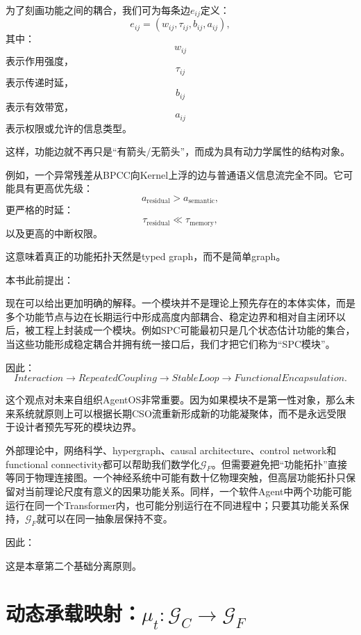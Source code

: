 为了刻画功能之间的耦合，我们可为每条边$e_{ij}$定义：
\[
e_{ij}
=
(
w_{ij},
\tau_{ij},
b_{ij},
a_{ij}
),
\]
其中：
\[
w_{ij}
\]
表示作用强度，
\[
\tau_{ij}
\]
表示传递时延，
\[
b_{ij}
\]
表示有效带宽，
\[
a_{ij}
\]
表示权限或允许的信息类型。

这样，功能边就不再只是“有箭头/无箭头”，而成为具有动力学属性的结构对象。

例如，一个异常残差从BPCC向Kernel上浮的边与普通语义信息流完全不同。它可能具有更高优先级：
\[
a_{\text{residual}}>a_{\text{semantic}},
\]
更严格的时延：
\[
\tau_{\text{residual}}\ll\tau_{\text{memory}},
\]
以及更高的中断权限。

这意味着真正的功能拓扑天然是typed graph，而不是简单graph。

本书此前提出：
\begin{statementbox}
\centering
{}
\end{statementbox}
现在可以给出更加明确的解释。一个模块并不是理论上预先存在的本体实体，而是多个功能节点与边在长期运行中形成高度内部耦合、稳定边界和相对自主闭环以后，被工程上封装成一个模块。例如SPC可能最初只是几个状态估计功能的集合，当这些功能形成稳定耦合并拥有统一接口后，我们才把它们称为“SPC模块”。

因此：
\[
Interaction
\rightarrow
RepeatedCoupling
\rightarrow
StableLoop
\rightarrow
FunctionalEncapsulation.
\]

这个观点对未来自组织AgentOS非常重要。因为如果模块不是第一性对象，那么未来系统就原则上可以根据长期CSO流重新形成新的功能凝聚体，而不是永远受限于设计者预先写死的模块边界。

外部理论中，网络科学、hypergraph、causal architecture、control network和functional connectivity都可以帮助我们数学化$\mathcal G_F$。但需要避免把“功能拓扑”直接等同于物理连接图。一个神经系统中可能有数十亿物理突触，但高层功能拓扑只保留对当前理论尺度有意义的因果功能关系。同样，一个软件Agent中两个功能可能运行在同一个Transformer内，也可能分别运行在不同进程中；只要其功能关系保持，$\mathcal G_F$就可以在同一抽象层保持不变。

因此：
\begin{statementbox}
\centering
{}
\end{statementbox}

这是本章第二个基础分离原则。

\section{动态承载映射：$\mu_t:\mathcal G_C\rightarrow\mathcal G_F$}

